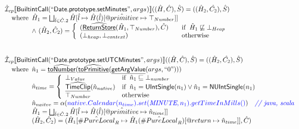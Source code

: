 \documentclass{article}
\makeatletter
\newcommand{\SF}[1]{\mbox{\textsf{#1}}}
\newcommand{\comment}[1]{\textit{#1}}
\newcommand{\wherec}[1]{{\rm where}\begin{array}[t]{l}#1\end{array}}
\newcommand{\ifc}[1]{{\rm if}\begin{array}[t]{l}#1\end{array}}
\newcommand{\owc}{{\rm otherwise}}
\newcommand{\aI}{\hat{\mathcal{I}}}
\newcommand{\lbr}{\llbracket}
\newcommand{\rbr}{\rrbracket}
\newcommand{\hf}[1]{\underline{\sf #1}}
\newcommand{\ahf}[1]{\widehat{\underline{\sf #1}}}
\newcommand{\varprop}[1]{@#1}
\newcommand{\avarloc}[1]{\hat{\##1}}
\newcommand{\avarprop}[1]{\hat{@#1}}
\def\inblue{\color{blue}}
\def\inblue{\color{blue}}
\makeatother
\begin{document}
\[\begin{array}{l}
\aI _{cp}\lbr \SF{BuiltintCall}(``\SF{Date.prototype.setMinutes}",args_{})\rbr((\hat{H},\hat{C}), \hat{S})
  = ((\hat{H}_2, \hat{C_2}), \hat{S})\\
\quad\wherec{
  \hat{H}_1 = \bigsqcup_{\hat{l} \in \hat{C}.2} \hat{H}[\hat{l}
    \mapsto \hat{H}(\hat{l})[\avarprop{primitive} \mapsto \top_{Number}]]\\
  \land\ (\hat{H}_2, \hat{C}_2) = 
    \left\{\begin{array}{l@{\quad\quad}l}
      (\ahf{ReturnStore}(\hat{H}_1, \top_{Number}), \hat{C})
      & \ifc{\hat{H}_1 \not\sqsubseteq \bot_{Heap}}\\
      (\bot_{heap}, \bot_{context}) & \owc \\
    \end{array}\right.\\
  }\\
\\\\

\aI _{cp}\lbr \SF{BuiltintCall}(``\SF{Date.prototype.setUTCMinutes}",args_{})\rbr((\hat{H},\hat{C}), \hat{S})
  = ((\hat{H}_2, \hat{C_2}), \hat{S})\\
\quad\wherec{
  \hat{n}_{1} = \ahf{toNumber}(\ahf{toPrimitive}(\hf{getArgValue}(args, ``0")))\\
  \hat{n}_{time} = \left\{\begin{array}{ll}
      \bot_{Value} & \ifc{\hat{n}_{1} \sqsubseteq  \bot_{number}}\\
      \ahf{TimeClip}(\hat{n}_{native})
      & \ifc{\hat{n}_{1} = \SF{UIntSingle}(n_{1}) \lor \hat{n}_{1} = \SF{NUIntSingle}(n_{1}) }\\
      \top_{Number} & \owc
    \end{array}\right.\\
  \hat{n}_{naitve} = \alpha({\inblue native.Calendar(n_{time}).set(\emph{MINUTE}, n_{1}).getTimeInMills()})
    \quad\comment{{\inblue // java, scala}}\\  
  \hat{H}_1 = \bigsqcup_{\hat{l} \in \hat{C}.2} \hat{H}[\hat{l}
    \mapsto \hat{H}(\hat{l})[\avarprop{primitive} \mapsto \hat{n}_{time}]]\\
  (\hat{H}_2, \hat{C}_2) = 
    (\hat{H}_1[\avarloc{PureLocal}_R \mapsto \hat{H}_1(\avarloc{PureLocal}_R)
      [\varprop{return} \mapsto \hat{n}_{time}]], \hat{C})\\
  }\\
\\\\


\end{array}\]
\end{document}
